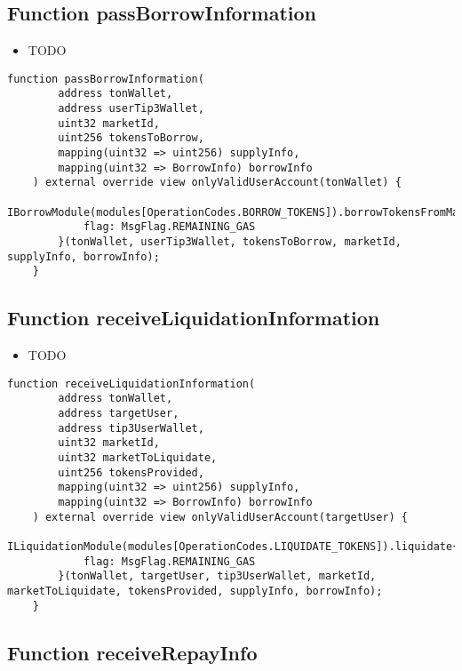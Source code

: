 \subsection{Function passBorrowInformation}

\noindent\begin{itemize}
\item TODO
\end{itemize}

\begin{lstlisting}[firstnumber=246]
    function passBorrowInformation(
        address tonWallet, 
        address userTip3Wallet, 
        uint32 marketId, 
        uint256 tokensToBorrow, 
        mapping(uint32 => uint256) supplyInfo, 
        mapping(uint32 => BorrowInfo) borrowInfo
    ) external override view onlyValidUserAccount(tonWallet) {
        IBorrowModule(modules[OperationCodes.BORROW_TOKENS]).borrowTokensFromMarket{
            flag: MsgFlag.REMAINING_GAS
        }(tonWallet, userTip3Wallet, tokensToBorrow, marketId, supplyInfo, borrowInfo);
    }
\end{lstlisting}

\subsection{Function receiveLiquidationInformation}

\noindent\begin{itemize}
\item TODO
\end{itemize}

\begin{lstlisting}[firstnumber=331]
    function receiveLiquidationInformation(
        address tonWallet, 
        address targetUser, 
        address tip3UserWallet, 
        uint32 marketId, 
        uint32 marketToLiquidate,
        uint256 tokensProvided, 
        mapping(uint32 => uint256) supplyInfo, 
        mapping(uint32 => BorrowInfo) borrowInfo
    ) external override view onlyValidUserAccount(targetUser) {
        ILiquidationModule(modules[OperationCodes.LIQUIDATE_TOKENS]).liquidate{
            flag: MsgFlag.REMAINING_GAS
        }(tonWallet, targetUser, tip3UserWallet, marketId, marketToLiquidate, tokensProvided, supplyInfo, borrowInfo);
    }
\end{lstlisting}

\subsection{Function receiveRepayInfo}

